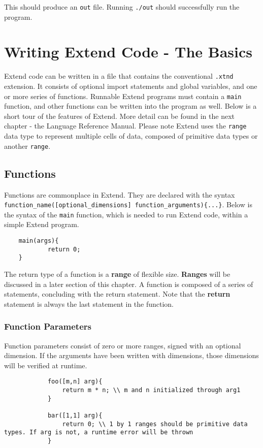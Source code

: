 	\medskip \noindent
	This should produce an \texttt{out} file. Running \texttt{./out} should successfully run the program.

\section{Writing Extend Code - The Basics}
Extend code can be written in a file that contains the conventional \texttt{.xtnd} extension. It consists of optional import statements and global variables, and one or more series of functions. Runnable Extend programs must contain a \texttt{main} function, and other functions can be written into the program as well.
\newline \newline
Below is a short tour of the features of Extend. More detail can be found in the next chapter - the Language Reference Manual. Please note Extend uses the \texttt{range} data type to represent multiple cells of data, composed of primitive data types or another \texttt{range}.

	\subsection{Functions}
	Functions are commonplace in Extend. They are declared with the syntax \texttt{function\_name([optional\_dimensions] function\_arguments)\{...\}}. Below is the syntax of the \texttt{main} function, which is needed to run Extend code, within a simple Extend program.

	\begin{lstlisting}
	main(args){
			return 0;
	}
	\end{lstlisting}

	\medskip \noindent
 	The return type of a function is a \textbf{range} of flexible size. \textbf{Ranges} will be discussed in a later section of this chapter. A function is composed of a series of statements, concluding with the return statement.
	Note that the \textbf{return} statement is always the last statement in the function.

		\subsubsection{Function Parameters}
		Function parameters consist of zero or more ranges, signed with an optional dimension. If the arguments have been written with dimensions, those dimensions will be verified at runtime.
		\begin{lstlisting}
			foo([m,n] arg){
				return m * n; \\ m and n initialized through arg1
			}

			bar([1,1] arg){
				return 0; \\ 1 by 1 ranges should be primitive data types. If arg is not, a runtime error will be thrown
			}
		\end{lstlisting}

